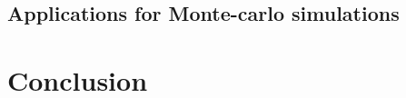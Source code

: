 \documentclass{bioinfo}
\begin{document}
	
	

	\subsection{Applications for Monte-carlo simulations}
	
	

	\section{Conclusion}
	
\end{document}
